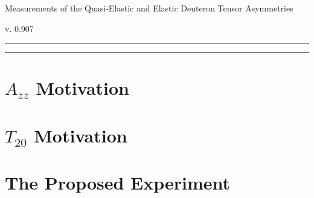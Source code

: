 \documentclass[12pt]{article}
\begin{document}
\linenumbers
\pagestyle{empty}
 
\begin{center}
 \LARGE{
  Measurements of the Quasi-Elastic and Elastic Deuteron Tensor Asymmetries
 }
 
 v. 0.907
\end{center}
%
\hrule \vspace{.05cm}\hrule
%


\newpage

\begin{abstract}
  
\end{abstract}

\newpage


%


\clearpage


\tableofcontents


\pagestyle{plain}

\clearpage

%

\section{$A_{zz}$ Motivation}









\section{$T_{20}$ Motivation}



\section{The Proposed Experiment}
\end{document}
